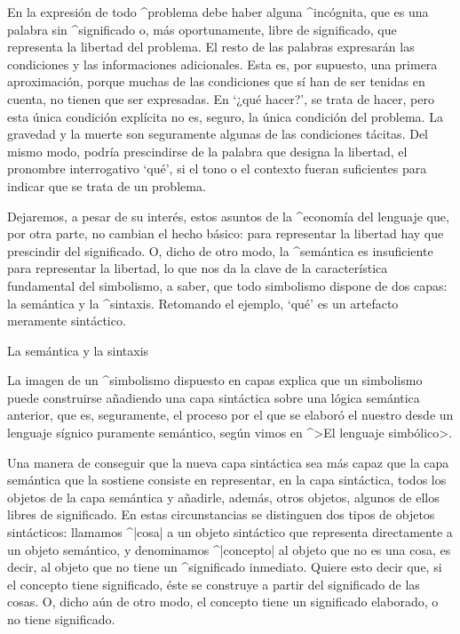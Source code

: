 En la expresión de todo ^{problema} debe haber alguna ^{incógnita}, que
es una palabra sin ^{significado} o, más oportunamente, libre de
significado, que representa la libertad del problema. El resto de las
palabras expresarán las condiciones y las informaciones adicionales.
Esta es, por supuesto, una primera aproximación, porque muchas de las
condiciones que sí han de ser tenidas en cuenta, no tienen que ser
expresadas. En `¿qué hacer?', se trata de hacer, pero esta única
condición explícita no es, seguro, la única condición del problema. La
gravedad y la muerte son seguramente algunas de las condiciones tácitas.
Del mismo modo, podría prescindirse de la palabra que designa la
libertad, el pronombre interrogativo `qué', si el tono o el contexto
fueran suficientes para indicar que se trata de un problema.

Dejaremos, a pesar de su interés, estos asuntos de la ^{economía del
lenguaje} que, por otra parte, no cambian el hecho básico: para
representar la libertad hay que prescindir del significado. O, dicho de
otro modo, la ^{semántica} es insuficiente para representar la libertad,
lo que nos da la clave de la característica fundamental del simbolismo,
a saber, que todo simbolismo dispone de dos capas: la semántica y la
^{sintaxis}. Retomando el ejemplo, `qué' es un artefacto meramente
sintáctico.


\Section La semántica y la sintaxis

La imagen de un ^{simbolismo} dispuesto en capas explica que un
simbolismo puede construirse añadiendo una capa sintáctica sobre una
lógica semántica anterior, que es, seguramente, el proceso por el que se
elaboró el nuestro desde un lenguaje sígnico puramente semántico, según
vimos en ^>El lenguaje simbólico>.

Una manera de conseguir que la nueva capa sintáctica sea más capaz que
la capa semántica que la sostiene consiste en representar, en la capa
sintáctica, todos los objetos de la capa semántica y añadirle, además,
otros objetos, algunos de ellos libres de significado. En estas
circunstancias se distinguen dos tipos de objetos sintácticos: llamamos
^|cosa| a un objeto sintáctico que representa directamente a un objeto
semántico, y denominamos ^|concepto| al objeto que no es una cosa, es
decir, al objeto que no tiene un ^{significado} inmediato. Quiere esto
decir que, si el concepto tiene significado, éste se construye a partir
del significado de las cosas. O, dicho aún de otro modo, el concepto
tiene un significado elaborado, o no tiene significado.

